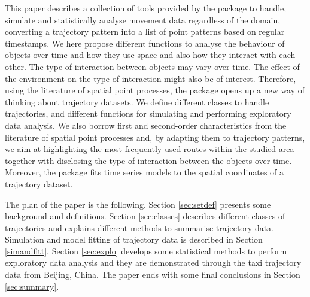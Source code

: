 \documentclass[article]{jss}
\begin{document}
This paper describes a collection of tools provided by the  package  to handle, simulate and statistically analyse movement data regardless of the domain, converting a trajectory pattern into a list of point patterns based on regular timestamps. We here propose different functions to analyse the behaviour of objects over time and how they use space and also how they interact with each other. The type of interaction between objects may vary over time. The effect of the environment on the type of interaction might also be of interest. Therefore, using the literature of spatial point processes, the  package  opens up a new way of thinking about trajectory datasets. We define different classes to handle trajectories, and different functions for simulating and performing exploratory data analysis. We also borrow first and second-order characteristics from the literature of spatial point processes and, by adapting them to trajectory patterns, we aim at highlighting the most frequently used routes within the studied area together with disclosing the type of interaction between the objects over time. Moreover, the  package fits time series models to the spatial coordinates of a trajectory dataset.

The plan of the paper is the following.
Section \ref{sec:setdef} presents some background and definitions.
Section \ref{sec:classes} describes different classes of trajectories and explains different methods to summarise trajectory data. Simulation and model fitting of trajectory data is described in Section \ref{simandfitt}. Section \ref{sec:explo} develops some statistical methods to perform exploratory data analysis and they are demonstrated through the taxi trajectory data from Beijing, China. The paper ends with some final conclusions in Section \ref{sec:summary}.
\end{document}
